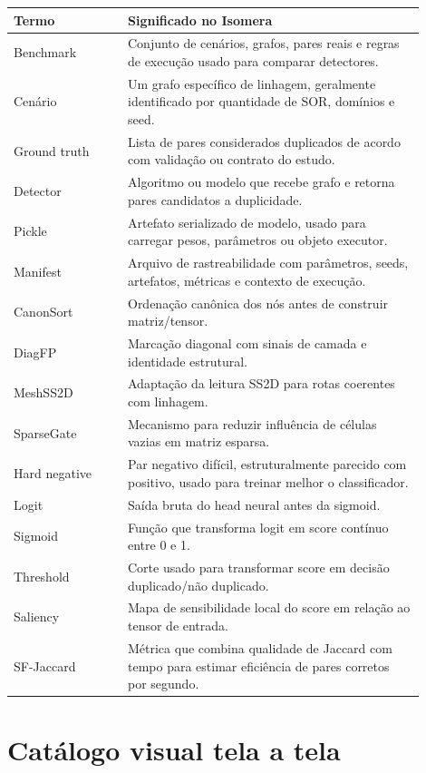 \documentclass[12pt,oneside]{book}
\begin{document}
\begin{longtable}{p{0.25\linewidth}p{0.65\linewidth}}
\textbf{Termo} & \textbf{Significado no Isomera} \\
\hline
Benchmark & Conjunto de cenários, grafos, pares reais e regras de execução usado para comparar detectores. \\
Cenário & Um grafo específico de linhagem, geralmente identificado por quantidade de SOR, domínios e seed. \\
Ground truth & Lista de pares considerados duplicados de acordo com validação ou contrato do estudo. \\
Detector & Algoritmo ou modelo que recebe grafo e retorna pares candidatos a duplicidade. \\
Pickle & Artefato serializado de modelo, usado para carregar pesos, parâmetros ou objeto executor. \\
Manifest & Arquivo de rastreabilidade com parâmetros, seeds, artefatos, métricas e contexto de execução. \\
CanonSort & Ordenação canônica dos nós antes de construir matriz/tensor. \\
DiagFP & Marcação diagonal com sinais de camada e identidade estrutural. \\
MeshSS2D & Adaptação da leitura SS2D para rotas coerentes com linhagem. \\
SparseGate & Mecanismo para reduzir influência de células vazias em matriz esparsa. \\
Hard negative & Par negativo difícil, estruturalmente parecido com positivo, usado para treinar melhor o classificador. \\
Logit & Saída bruta do head neural antes da sigmoid. \\
Sigmoid & Função que transforma logit em score contínuo entre 0 e 1. \\
Threshold & Corte usado para transformar score em decisão duplicado/não duplicado. \\
Saliency & Mapa de sensibilidade local do score em relação ao tensor de entrada. \\
SF-Jaccard & Métrica que combina qualidade de Jaccard com tempo para estimar eficiência de pares corretos por segundo. \\
\end{longtable}

\chapter{Catálogo visual tela a tela}
\end{document}
